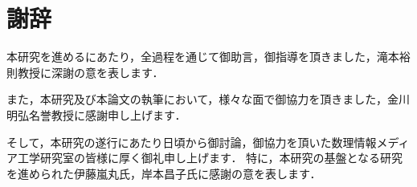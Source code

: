 
\chapter*{謝辞}

本研究を進めるにあたり，全過程を通じて御助言，御指導を頂きました，滝本裕則教授に深謝の意を表します．

また，本研究及び本論文の執筆において，様々な面で御協力を頂きました，金川明弘名誉教授に感謝申し上げます．

そして，本研究の遂行にあたり日頃から御討論，御協力を頂いた数理情報メディア工学研究室の皆様に厚く御礼申し上げます．
特に，本研究の基盤となる研究を進められた伊藤嵐丸氏，岸本昌子氏に感謝の意を表します．